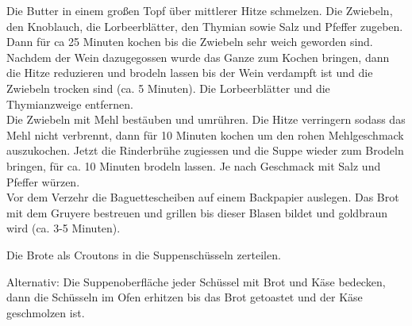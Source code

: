 \vspace*{\fill}
\begin{multicols}{2}

Die Butter in einem großen Topf über mittlerer Hitze schmelzen.
Die Zwiebeln, den Knoblauch, die Lorbeerblätter, den Thymian sowie Salz und Pfeffer zugeben.
Dann für ca 25 Minuten kochen bis die Zwiebeln sehr weich geworden sind.\newline
Nachdem der Wein dazugegossen wurde das Ganze zum Kochen bringen, dann die Hitze reduzieren und brodeln lassen
bis der Wein verdampft ist und die Zwiebeln trocken sind (ca. 5 Minuten).
Die Lorbeerblätter und die Thymianzweige entfernen.\\ Die Zwiebeln mit Mehl bestäuben und umrühren.
Die Hitze verringern sodass das Mehl nicht verbrennt, dann für 10 Minuten kochen um den rohen Mehlgeschmack auszukochen.
Jetzt die Rinderbrühe zugiessen und die Suppe wieder zum Brodeln bringen, für ca. 10 Minuten brodeln lassen.
Je nach Geschmack mit Salz und Pfeffer würzen.\\

Vor dem Verzehr die Baguettescheiben auf einem Backpapier auslegen.
Das Brot mit dem Gruyere bestreuen und grillen bis dieser Blasen bildet und goldbraun wird (ca. 3-5 Minuten).

Die Brote als Croutons in die Suppenschüsseln zerteilen. 


Alternativ: Die Suppenoberfläche jeder Schüssel mit Brot und Käse bedecken, dann die Schüsseln im Ofen
erhitzen bis das Brot getoastet und der Käse geschmolzen ist.


\end{multicols}
\vfill

